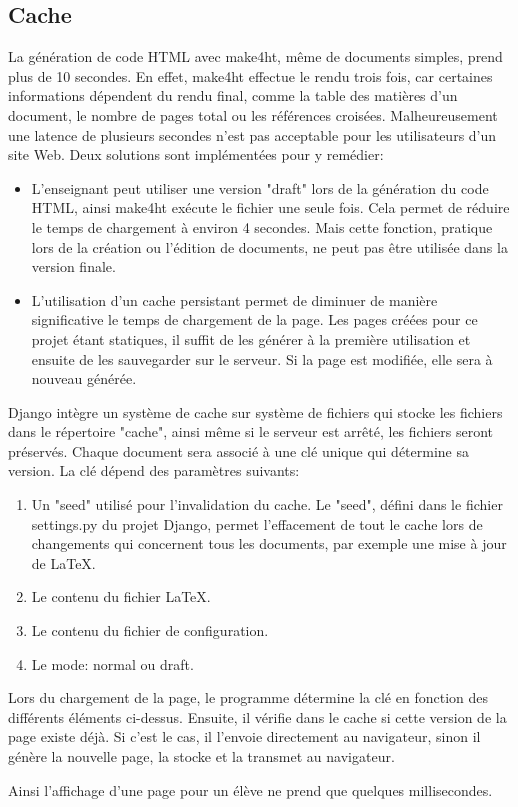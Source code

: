 \documentclass[12pt,titlepage,oneside]{article}
\begin{document}
\subsection{Cache}
La génération de code HTML avec make4ht, même de documents simples, prend plus de 10 secondes. En effet, make4ht effectue le rendu trois fois, car certaines informations dépendent du rendu final, comme la table des matières d'un document, le nombre de pages total ou les références croisées. Malheureusement une latence de plusieurs secondes n'est pas acceptable pour les utilisateurs d'un site Web. Deux solutions sont implémentées pour y remédier:
\begin{itemize}
\item L'enseignant peut utiliser une version "draft" lors de la génération du code HTML, ainsi make4ht exécute le fichier une seule fois. Cela permet de réduire le temps de chargement à environ 4 secondes. Mais cette fonction, pratique lors de la création ou l'édition de documents, ne peut pas être utilisée dans la version finale.
\item L'utilisation d'un cache persistant permet de diminuer de manière significative le temps de chargement de la page. Les pages créées pour ce projet étant statiques, il suffit de les générer à la première utilisation et ensuite de les sauvegarder sur le serveur. Si la page est modifiée, elle sera à nouveau générée.
\end{itemize}
Django intègre un système de cache sur système de fichiers qui stocke les fichiers dans le répertoire "cache", ainsi même si le serveur est arrêté, les fichiers seront préservés. Chaque document sera associé à une clé unique qui détermine sa version. La clé dépend des paramètres suivants:
\begin{enumerate}
\item Un "seed" utilisé pour l'invalidation du cache. Le "seed", défini dans le fichier settings.py du projet Django, permet l'effacement de tout le cache lors de changements qui concernent tous les documents, par exemple une mise à jour de LaTeX.
\item Le contenu du fichier LaTeX.
\item Le contenu du fichier de configuration.
\item Le mode: normal ou draft.
\end{enumerate}
Lors du chargement de la page, le programme détermine la clé en fonction des différents éléments ci-dessus. Ensuite, il vérifie dans le cache si cette version de la page existe déjà. Si c'est le cas, il l'envoie directement au navigateur, sinon il génère la nouvelle page, la stocke et la transmet au navigateur.\par
Ainsi l'affichage d'une page pour un élève ne prend que quelques millisecondes.
\end{document}
